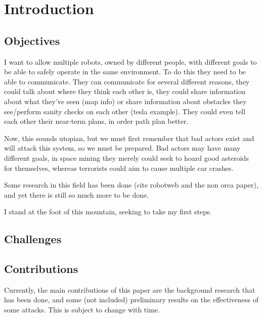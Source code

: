 \chapter{Introduction}
\section{Objectives}
I want to allow multiple robots, owned by different people, with different goals to be able to safely operate in the same environment. To do this they need to be able to communicate. They can communicate for several different reasons, they could talk about where they think each other is, they could share information about what they've seen (map info) or share information about obstacles they see/perform sanity checks on each other (tesla example). They could even tell each other their near-term plans, in order path plan better. 

Now, this sounds utopian, but we must first remember that bad actors exist and will attack this system, so we must be prepared. Bad actors may have many different goals, in space mining they merely could seek to hoard good asteroids for themselves, whereas terrorists could aim to cause multiple car crashes.

Some research in this field has been done (cite robotweb and the non orca paper), and yet there is still so much more to be done. 

I stand at the foot of this mountain, seeking to take my first steps.

\section{Challenges}
\section{Contributions}
Currently, the main contributions of this paper are the background research that has been done, and some (not included) preliminary results on the effectiveness of some attacks. This is subject to change with time.